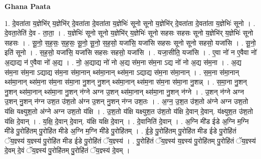 \documentclass[17pt]{extarticle}
\begin{document}
\textbf{Ghana Paata } \newline

1. दे॒वता॑ता य॒ज्ञेभि॑र् य॒ज्ञेभि॑र् दे॒वता॑ता दे॒वता॑ता य॒ज्ञेभिः॑ सूनो सूनो य॒ज्ञेभि॑र् दे॒वता॑ता दे॒वता॑ता य॒ज्ञेभिः॑ सूनो । . दे॒वता॒तेति॑ दे॒व - ता॒ता॒ । . य॒ज्ञेभिः॑ सूनो सूनो य॒ज्ञेभि॑र् य॒ज्ञेभिः॑ सूनो सहसः सहसः सूनो य॒ज्ञेभि॑र् य॒ज्ञेभिः॑ सूनो सहसः । . सू॒नो॒ स॒ह॒सः॒ स॒ह॒सः॒ सू॒नो॒ सू॒नो॒ स॒ह॒सो॒ यजा॑सि॒ यजा॑सि सहसः सूनो सूनो सहसो॒ यजा॑सि । . सू॒नो॒ इति॑ सूनो । . स॒ह॒सो॒ यजा॑सि॒ यजा॑सि सहसः सहसो॒ यजा॑सि । . यजा॒सीति॒ यजा॑सि । . ए॒वा नो॑ न ए॒वैवा नो॑ अ॒द्याद्य न॑ ए॒वैवा नो॑ अ॒द्य । . नो॒ अ॒द्याद्य नो॑ नो अ॒द्य स॑म॒ना स॑म॒ना ऽद्य नो॑ नो अ॒द्य स॑म॒ना । . अ॒द्य स॑म॒ना स॑म॒ना ऽद्याद्य स॑म॒ना स॑मा॒नान् थ्स॑मा॒नान् थ्स॑म॒ना ऽद्याद्य स॑म॒ना स॑मा॒नान् । . स॒म॒ना स॑मा॒नान् थ्स॑मा॒नान् थ्स॑म॒ना स॑म॒ना स॑मा॒ना नु॒शन् नु॒शन् थ्स॑मा॒नान् थ्स॑म॒ना स॑म॒ना स॑मा॒ना नु॒शन्न् । . स॒मा॒ना नु॒शन् नु॒शन् थ्स॑मा॒नान् थ्स॑मा॒ना नु॒शन् न॑ग्ने अग्न उ॒शन् थ्स॑मा॒नान् थ्स॑मा॒ना नु॒शन् न॑ग्ने । . उ॒शन् न॑ग्ने अग्न उ॒शन् नु॒शन् न॑ग्न उश॒त उ॑श॒तो अ॑ग्न उ॒शन् नु॒शन् न॑ग्न उश॒तः । . अ॒ग्न॒ उ॒श॒त उ॑श॒तो अ॑ग्ने अग्न उश॒तो य॑क्षि यक्ष्युश॒तो अ॑ग्ने अग्न उश॒तो य॑क्षि । . उ॒श॒तो य॑क्षि यक्ष्युश॒त उ॑श॒तो य॑क्षि दे॒वान् दे॒वान्. य॑क्ष्युश॒त उ॑श॒तो य॑क्षि दे॒वान् । . य॒क्षि॒ दे॒वान् दे॒वान्. य॑क्षि यक्षि दे॒वान् । . दे॒वानिति॑ दे॒वान् । . अ॒ग्नि मी॑ड ईडे अ॒ग्नि म॒ग्नि मी॑डे पु॒रोहि॑तम् पु॒रोहि॑त मीडे अ॒ग्नि म॒ग्नि मी॑डे पु॒रोहि॑तम् । . ई॒डे॒ पु॒रोहि॑तम् पु॒रोहि॑त मीड ईडे पु॒रोहि॑तं ॅय॒ज्ञ्स्य॑ य॒ज्ञ्स्य॑ पु॒रोहि॑त मीड ईडे पु॒रोहि॑तं ॅय॒ज्ञ्स्य॑ । . पु॒रोहि॑तं ॅय॒ज्ञ्स्य॑ य॒ज्ञ्स्य॑ पु॒रोहि॑तम् पु॒रोहि॑तं ॅय॒ज्ञ्स्य॑ दे॒वम् दे॒वं ॅय॒ज्ञ्स्य॑ पु॒रोहि॑तम् पु॒रोहि॑तं ॅय॒ज्ञ्स्य॑ दे॒वम् । \newline
\end{document}

